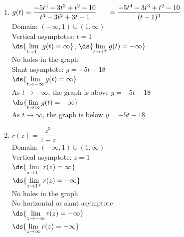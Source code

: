 \documentclass{ximera}
\begin{document}
\begin{multicols}{2}
\begin{enumerate}
\setcounter{enumi}{\value{HW}}

\item \small $g(t) = \dfrac{-5t^{4} - 3t^{3} + t^{2} - 10}{t^{3} - 3t^{2} + 3t - 1} \\ \phantom{g(t)} = \dfrac{-5t^{4} - 3t^{3} + t^{2} - 10}{(t-1)^3} $ \normalsize \\
Domain: $(-\infty, 1) \cup (1, \infty)$\\
Vertical asymptotes: $t = 1$\\
$\ds{\lim_{t \rightarrow 1^{-}} g(t)=  \infty}$, $\ds{\lim_{t \rightarrow 1^{+}} g(t)=  -\infty}$ \\
No holes in the graph \\
Slant asymptote: $y=-5t-18$ \\
$\ds{\lim_{t \rightarrow -\infty} g(t) = \infty}$\\
 \small  As $t \rightarrow -\infty$, the graph is above $y=-5t-18$ \normalsize\\
 $\ds{\lim_{t \rightarrow \infty} g(t) = -\infty}$\\
 \small  As $t \rightarrow \infty$, the graph is below $y=-5t-18$ \normalsize \\

 \vfill

 \columnbreak

\item $r(z) = \dfrac{z^3}{1-z}$\\
Domain: $(-\infty, 1) \cup (1, \infty)$\\
Vertical asymptote: $z=1$\\
$\ds{\lim_{z \rightarrow 1^{-}} r(z) =  \infty}$ \\
$\ds{\lim_{z \rightarrow 1^{+}} r(z) =  -\infty}$ \\
No holes in the graph \\
No horizontal or slant asymptote \\
$\ds{\lim_{z \rightarrow  -  \infty} r(z)  = -\infty}$\\
$\ds{\lim_{z \rightarrow   \infty} r(z)  = -\infty}$\\
\setcounter{HW}{\value{enumi}}
\end{enumerate}
\end{multicols}
\end{document}
